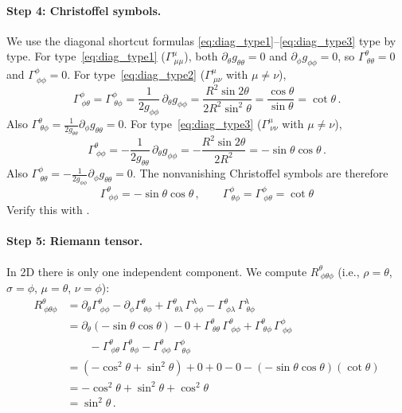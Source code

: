 \paragraph{Step 4: Christoffel symbols.}
We use the diagonal shortcut formulas
\eqref{eq:diag_type1}--\eqref{eq:diag_type3} type by type.
For type~\eqref{eq:diag_type1} ($\Gamma^\mu_{\ \mu\mu}$),
both $\partial_\theta g_{\theta\theta} = 0$ and
$\partial_\phi g_{\phi\phi} = 0$, so
$\Gamma^\theta_{\ \theta\theta} = 0$ and
$\Gamma^\phi_{\ \phi\phi} = 0$.
For type~\eqref{eq:diag_type2} ($\Gamma^\mu_{\ \mu\nu}$
with $\mu \neq \nu$),
\[
    \Gamma^\phi_{\ \phi\theta}
    = \Gamma^\phi_{\ \theta\phi}
    = \frac{1}{2g_{\phi\phi}}\, \partial_\theta g_{\phi\phi}
    = \frac{R^2 \sin 2\theta}{2 R^2 \sin^2\theta}
    = \frac{\cos\theta}{\sin\theta}
    = \cot\theta \,.
\]
Also $\Gamma^\theta_{\ \theta\phi} = \frac{1}{2g_{\theta\theta}}\partial_\phi g_{\theta\theta} = 0$.
For type~\eqref{eq:diag_type3} ($\Gamma^\mu_{\ \nu\nu}$
with $\mu \neq \nu$),
\[
    \Gamma^\theta_{\ \phi\phi}
    = -\frac{1}{2g_{\theta\theta}}\, \partial_\theta g_{\phi\phi}
    = -\frac{R^2 \sin 2\theta}{2R^2}
    = -\sin\theta\cos\theta \,.
\]
Also $\Gamma^\phi_{\ \theta\theta} = -\frac{1}{2g_{\phi\phi}}\partial_\phi g_{\theta\theta} = 0$.
The nonvanishing Christoffel symbols are therefore
\begin{equation}
    \boxed{
    \Gamma^\theta_{\ \phi\phi} = -\sin\theta\cos\theta \,, \qquad
    \Gamma^\phi_{\ \theta\phi} = \Gamma^\phi_{\ \phi\theta} = \cot\theta
    }
    \label{eq:cookbook_christoffel_sphere}
\end{equation}
Verify this with
.

\paragraph{Step 5: Riemann tensor.}
In 2D there is only one independent component.  We compute
$R^\theta_{\ \phi\theta\phi}$ (i.e., $\rho = \theta$, $\sigma = \phi$,
$\mu = \theta$, $\nu = \phi$):
\begin{align}
    R^\theta_{\ \phi\theta\phi}
    &= \partial_\theta \Gamma^\theta_{\ \phi\phi}
     - \partial_\phi \Gamma^\theta_{\ \theta\phi}
     + \Gamma^\theta_{\ \theta\lambda}\,\Gamma^\lambda_{\ \phi\phi}
     - \Gamma^\theta_{\ \phi\lambda}\,\Gamma^\lambda_{\ \theta\phi}
    \nonumber \\[4pt]
    &= \partial_\theta(-\sin\theta\cos\theta) - 0
     + \Gamma^\theta_{\ \theta\theta}\,\Gamma^\theta_{\ \phi\phi}
     + \Gamma^\theta_{\ \theta\phi}\,\Gamma^\phi_{\ \phi\phi}
    \nonumber \\
    &\qquad
     - \Gamma^\theta_{\ \phi\theta}\,\Gamma^\theta_{\ \theta\phi}
     - \Gamma^\theta_{\ \phi\phi}\,\Gamma^\phi_{\ \theta\phi}
    \nonumber \\[4pt]
    &= (-\cos^2\theta + \sin^2\theta)
     + 0 + 0
     - 0 - (-\sin\theta\cos\theta)(\cot\theta)
    \nonumber \\[4pt]
    &= -\cos^2\theta + \sin^2\theta + \cos^2\theta
    \nonumber \\[4pt]
    &= \sin^2\theta \,.
    \label{eq:cookbook_riemann_sphere}
\end{align}

